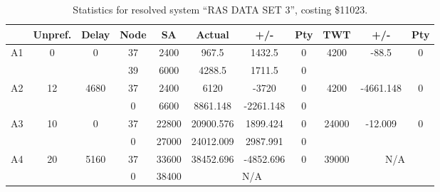 \begin{sidewaystable}
\centering
\footnotesize
\caption{Statistics for resolved system ``RAS DATA SET 3'', costing \$11023.}
\begin{tabular}{c||c|c||c|c|c|c|c||c|c|c}
  \hline \hline
  &
  Unpref. & 
  Delay &
  Node &
  SA &
  Actual &
  +/- &
  Pty &
  TWT &
  +/- &
  Pty \\
      \hline
      \multirow{2}{*}{A1} &
      \multirow{2}{*}{0} &
      \multirow{2}{*}{0} &
      37 &
      2400 &
        967.5 &
        1432.5 &
        0 &
      \multirow{2}{*}{4200} &
        \multirow{2}{*}{-88.5} &
        \multirow{2}{*}{0}
      \\
      \cline{4-8}
       &
       &
       &
      39 &
      6000 &
        4288.5 &
        1711.5 &
        0 &
      
         &
        
      \\
      \hline
      \multirow{2}{*}{A2} &
      \multirow{2}{*}{12} &
      \multirow{2}{*}{4680} &
      37 &
      2400 &
        6120 &
        -3720 &
        0 &
      \multirow{2}{*}{4200} &
        \multirow{2}{*}{-4661.148} &
        \multirow{2}{*}{0}
      \\
      \cline{4-8}
       &
       &
       &
      0 &
      6600 &
        8861.148 &
        -2261.148 &
        0 &
      
         &
        
      \\
      \hline
      \multirow{2}{*}{A3} &
      \multirow{2}{*}{10} &
      \multirow{2}{*}{0} &
      37 &
      22800 &
        20900.576 &
        1899.424 &
        0 &
      \multirow{2}{*}{24000} &
        \multirow{2}{*}{-12.009} &
        \multirow{2}{*}{0}
      \\
      \cline{4-8}
       &
       &
       &
      0 &
      27000 &
        24012.009 &
        2987.991 &
        0 &
      
         &
        
      \\
      \hline
      \multirow{2}{*}{A4} &
      \multirow{2}{*}{20} &
      \multirow{2}{*}{5160} &
      37 &
      33600 &
        38452.696 &
        -4852.696 &
        0 &
      \multirow{2}{*}{39000} &
        \multicolumn{2}{c}{\multirow{2}{*}{N/A}}
      \\
      \cline{4-8}
       &
       &
       &
      0 &
      38400 &
        \multicolumn{3}{|c||}{N/A} &
      

\end{tabular}
\end{sidewaystable}
